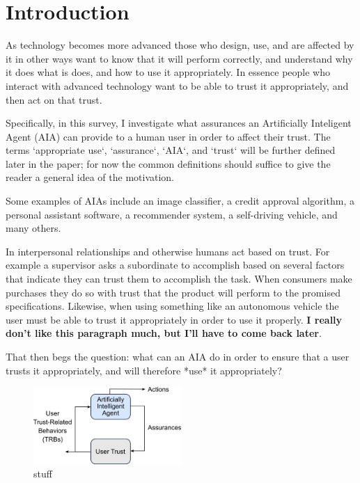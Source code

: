 \section{Introduction}
    As technology becomes more advanced those who design, use, and are affected by it in other ways want to know that it will perform correctly, and understand why it does what is does, and how to use it appropriately. In essence people who interact with advanced technology want to be able to trust it appropriately, and then act on that trust.

    Specifically, in this survey, I investigate what assurances an Artificially Inteligent Agent (AIA) can provide to a human user in order to affect their trust. The terms `appropriate use`, `assurance`, `AIA`, and `trust` will be further defined later in the paper; for now the common definitions should suffice to give the reader a general idea of the motivation.

    Some examples of AIAs include an image classifier, a credit approval algorithm, a personal assistant software, a recommender system, a self-driving vehicle, and many others.

    In interpersonal relationships and otherwise humans act based on trust. For example a supervisor asks a subordinate to accomplish based on several factors that indicate they can trust them to accomplish the task. When consumers make purchases they do so with trust that the product will perform to the promised specifications. Likewise, when using something like an autonomous vehicle the user must be able to trust it appropriately in order to use it properly. \textbf{I really don't like this paragraph much, but I'll have to come back later}.

    That then begs the question: what can an AIA do in order to ensure that a user trusts it appropriately, and will therefore *use* it appropriately?

    \begin{figure}
        \centering
        \includegraphics[width=0.5\textwidth]{Figures/SimpleTrust_one_way.png}
        \caption{stuff}
    \end{figure}

